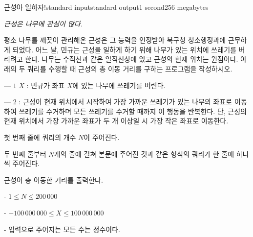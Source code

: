 \begin{problem}{근성아 일하자!}{standard input}{standard output}{1 second}{256 megabytes}

\it{근성은 나무에 관심이 많다.}

평소 나무를 깨끗이 관리해온 근성은 그 능력을 인정받아 북구청 청소행정과에 근무하게 되었다. 어느 날, 민규는 근성을 일하게 하기 위해 나무가 있는 위치에 쓰레기를 버리려고 한다. 나무는 수직선과 같은 일직선상에 있고 근성의 현재 위치는 원점이다. 아래의 두 쿼리를 수행할 때 근성의 총 이동 거리를 구하는 프로그램을 작성하시오.

--- $1$ $X$ : 민규가 좌표 $X$에 있는 나무에 쓰레기를 버린다.

--- $2$ : 근성이 현재 위치에서 시작하여 가장 가까운 쓰레기가 있는 나무의 좌표로 이동하여 쓰레기를 수거하며 모든 쓰레기를 수거할 때까지 이 행동을 반복한다. 단, 근성의 현재 위치에서 가장 가까운 좌표가 두 개 이상일 시 가장 작은 좌표로 이동한다.

\InputFile
첫 번째 줄에 쿼리의 개수 $N$이 주어진다.

두 번째 줄부터 $N$개의 줄에 걸쳐 본문에 주어진 것과 같은 형식의 쿼리가 한 줄에 하나씩 주어진다.

\OutputFile
근성이 총 이동한 거리를 출력한다.

\Example

\begin{example}
%
\end{example}

\Note
- $1 \le N \le 200\,000$ 

- $-100\,000\,000 \le X \le 100\,000\,000$ 

- 입력으로 주어지는 모든 수는 정수이다.

\end{problem}

